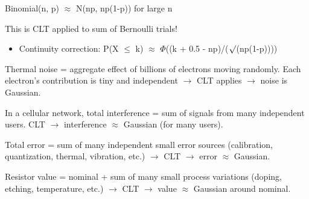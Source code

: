 
Binomial(n, p) \ensuremath{\approx} N(np, np(1-p)) for large n

This is CLT applied to sum of Bernoulli trials!

\begin{itemize}
\tightlist
\item
  Continuity correction: P(X \ensuremath{\le} k) \ensuremath{\approx} \ensuremath{\Phi}((k + 0.5 - np)/(\ensuremath{\surd}(np(1-p))))
\end{itemize}



Thermal noise = aggregate effect of billions of electrons moving randomly. Each electron’s contribution is tiny and independent \ensuremath{\to} CLT applies \ensuremath{\to} noise is Gaussian.


In a cellular network, total interference = sum of signals from many independent users. CLT \ensuremath{\to} interference \ensuremath{\approx} Gaussian (for many users).


Total error = sum of many independent small error sources (calibration, quantization, thermal, vibration, etc.) \ensuremath{\to} CLT \ensuremath{\to} error \ensuremath{\approx} Gaussian.


Resistor value = nominal + sum of many small process variations (doping, etching, temperature, etc.) \ensuremath{\to} CLT \ensuremath{\to} value \ensuremath{\approx} Gaussian around nominal.


